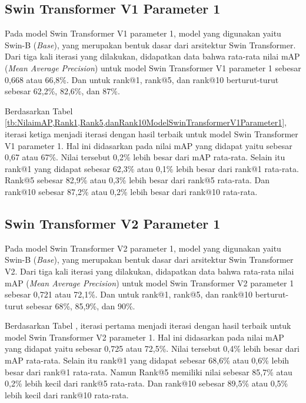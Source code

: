 \subsection{Swin Transformer V1 Parameter 1}

Pada model Swin Transformer V1 parameter 1, model yang digunakan yaitu Swin-B (\emph{Base}), yang merupakan bentuk 
dasar dari arsitektur Swin Transformer. Dari tiga kali iterasi yang dilakukan, didapatkan data bahwa rata-rata nilai 
mAP (\emph{Mean Average Precision}) untuk model Swin Transformer V1 parameter 1 sebesar 0,668 atau 66,8\%. Dan untuk 
rank@1, rank@5, dan rank@10 berturut-turut sebesar 62,2\%, 82,6\%, dan 87\%. 

Berdasarkan Tabel \ref{tb:NilaimAP,Rank1,Rank5,danRank10ModelSwinTransformerV1Parameter1}, iterasi ketiga menjadi 
iterasi dengan hasil terbaik untuk model Swin Transformer V1 parameter 1. 
Hal ini didasarkan pada nilai mAP yang didapat yaitu sebesar 0,67 atau 67\%. Nilai tersebut 0,2\% lebih besar dari 
mAP rata-rata. Selain itu rank@1 yang didapat sebesar 62,3\% atau 0,1\% lebih besar dari rank@1 rata-rata. Rank@5 sebesar 
82,9\% atau 0,3\% lebih besar dari rank@5 rata-rata. Dan rank@10 sebesar 87,2\% atau 0,2\% lebih besar dari rank@10 
rata-rata.

\subsection{Swin Transformer V2 Parameter 1}

Pada model Swin Transformer V2 parameter 1, model yang digunakan yaitu Swin-B (\emph{Base}), yang merupakan bentuk 
dasar dari arsitektur Swin Transformer V2. Dari tiga kali iterasi yang dilakukan, didapatkan data bahwa rata-rata nilai 
mAP (\emph{Mean Average Precision}) untuk model Swin Transformer V2 parameter 1 sebesar 0,721 atau 72,1\%. Dan untuk 
rank@1, rank@5, dan rank@10 berturut-turut sebesar 68\%, 85,9\%, dan 90\%. 

Berdasarkan Tabel , iterasi pertama menjadi 
iterasi dengan hasil terbaik untuk model Swin Transformer V2 parameter 1. 
Hal ini didasarkan pada nilai mAP yang didapat yaitu sebesar 0,725 atau 72,5\%. Nilai tersebut 0,4\% lebih besar dari 
mAP rata-rata. Selain itu rank@1 yang didapat sebesar 68,6\% atau 0,6\% lebih besar dari rank@1 rata-rata. Namun 
Rank@5 memiliki nilai sebesar 85,7\% atau 0,2\% lebih kecil dari rank@5 rata-rata. Dan rank@10 sebesar 89,5\% atau 0,5\% 
lebih kecil dari rank@10 rata-rata.

